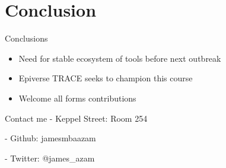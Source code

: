 \documentclass[10pt]{beamer}
\begin{document}
\section{Conclusion}
\begin{frame}[fragile]{Conclusions}
\begin{itemize}
	\item Need for stable ecosystem of tools before next outbreak
	\item Epiverse TRACE seeks to champion this course
	\item Welcome all forms contributions
\end{itemize}
\end{frame}
\begin{frame}[fragile]{Contact me}
	- Keppel Street: Room 254 
	
	- Github: jamesmbaazam
	
	- Twitter: @james\_azam
\end{frame}
\end{document}
